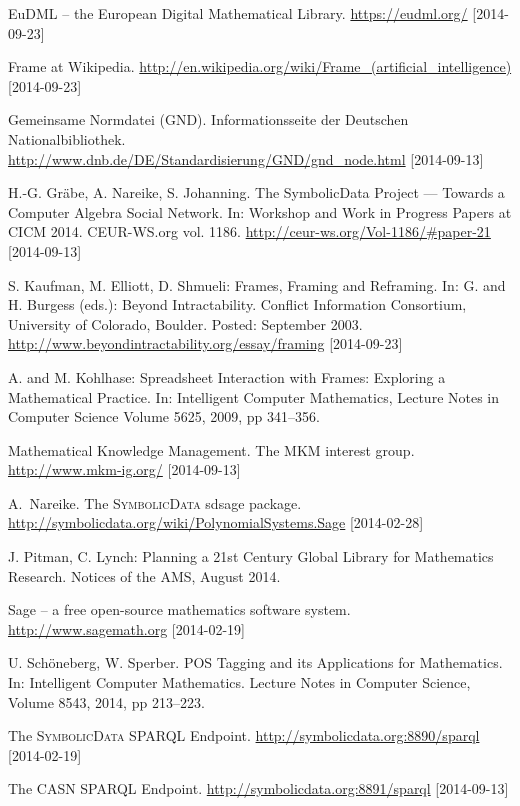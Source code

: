 \documentclass[a4paper,11pt]{article}
\def\SD{\textsc{SymbolicData}}
\begin{document}
\begin{multicols}{2}
\begin{thebibliography}{1}
 EuDML -- the European Digital Mathematical Library.
  \url{https://eudml.org/} [2014-09-23]

 Frame at Wikipedia.
  \url{http://en.wikipedia.org/wiki/Frame_(artificial_intelligence)}
      [2014-09-23]

 Gemeinsame Normdatei (GND). Informationsseite der
  Deutschen Nationalbibliothek.
  \url{http://www.dnb.de/DE/Standardisierung/GND/gnd_node.html}
      [2014-09-13]

 H.-G. Gr\"abe, A. Nareike, S. Johanning. The
  SymbolicData Project --- Towards a Computer Algebra Social Network.
  In: Workshop and Work in Progress Papers at CICM 2014. CEUR-WS.org
  vol. 1186.  \url{http://ceur-ws.org/Vol-1186/#paper-21}
  [2014-09-13]

 S. Kaufman, M. Elliott, D. Shmueli: Frames,
  Framing and Reframing.  In: G. and H. Burgess (eds.): Beyond
  Intractability. Conflict Information Consortium, University of
  Colorado, Boulder. Posted: September 2003. 
  \url{http://www.beyondintractability.org/essay/framing} [2014-09-23]

 A. and M. Kohlhase: Spreadsheet Interaction with
  Frames: Exploring a Mathematical Practice. In: Intelligent Computer
  Mathematics, Lecture Notes in Computer Science Volume 5625, 2009, pp
  341--356.

 Mathematical Knowledge Management. The MKM interest
  group.  \url{http://www.mkm-ig.org/} [2014-09-13]

 A.\ Nareike. The {\SD} sdsage package.
  \url{http://symbolicdata.org/wiki/PolynomialSystems.Sage}
      [2014-02-28]

 J. Pitman, C. Lynch: Planning a 21st Century
  Global Library for Mathematics Research.  Notices of the AMS, August
  2014.

 Sage -- a free open-source mathematics software
  system.  \url{http://www.sagemath.org} [2014-02-19]

 U. Sch\"oneberg, W. Sperber.  POS Tagging and its
  Applications for Mathematics.  In: Intelligent Computer Mathematics.
  Lecture Notes in Computer Science, Volume 8543, 2014, pp 213--223.

 The {\SD} SPARQL Endpoint.
   \url{http://symbolicdata.org:8890/sparql} [2014-02-19]

 The CASN SPARQL Endpoint.
   \url{http://symbolicdata.org:8891/sparql} [2014-09-13]


\end{thebibliography}
\end{multicols}
\end{document}
